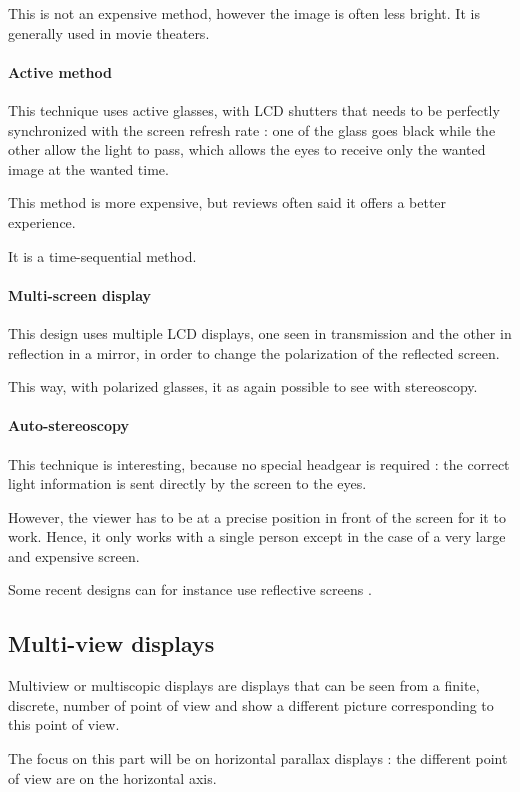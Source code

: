 This is not an expensive method, however the image is often less bright. It is generally used in movie theaters.

\paragraph{Active method}
This technique uses active glasses, with LCD shutters that needs to be perfectly synchronized with the screen refresh rate : one of the glass goes black while the other allow the light to pass, which allows the eyes to receive only the wanted image at the wanted time.

This method is more expensive, but reviews often said it offers a better experience.

It is a time-sequential method.

\paragraph{Multi-screen display}
This design uses multiple LCD displays, one seen in transmission and the other in reflection in a mirror, in order to change the polarization of the reflected screen.

This way, with polarized glasses, it as again possible to see with stereoscopy.

\paragraph{Auto-stereoscopy}
This technique is interesting, because no special headgear is required : the correct light information is sent directly by the screen to the eyes.

However, the viewer has to be at a precise position in front of the screen for it to work. Hence, it only works with a single person except in the case of a very large and expensive screen.

Some recent designs can for instance use reflective screens \cite{smithwick2013autostereoscopic}.

\subsection{Multi-view displays}
Multiview or multiscopic displays are displays that can be seen from a finite, discrete, number of point of view and show a different picture corresponding to this point of view.

The focus on this part will be on horizontal parallax displays : the different point of view are on the horizontal axis.

